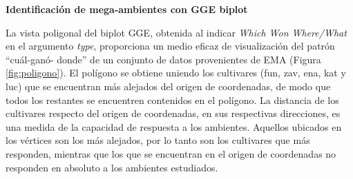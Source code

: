 

\textbf{Identificación de mega-ambientes con GGE biplot}

La vista poligonal del biplot GGE, obtenida al indicar \emph{Which Won Where/What} en el argumento \emph{type}, proporciona un medio eficaz de visualización del patrón ``cuál-ganó-
donde''  de un conjunto de datos provenientes de EMA (Figura \ref{fig:poligono}).  El polígono se obtiene uniendo los cultivares (fun, zav, ena, kat y luc) que se encuentran más alejados del origen de coordenadas, de modo que todos los restantes se encuentren contenidos en el polígono. La distancia de los cultivares respecto del origen de coordenadas, en sus respectivas direcciones, es una medida de la capacidad de respuesta a los ambientes. Aquellos ubicados en los vértices son los más alejados, por lo tanto son los cultivares que más responden, mientras que los que se encuentran en el origen de coordenadas no responden en absoluto a los ambientes estudiados.

